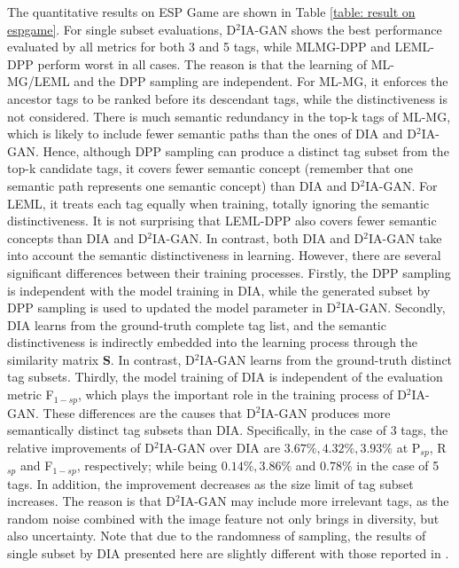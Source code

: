 \documentclass[10pt,twocolumn,letterpaper]{article}
\begin{document}
The quantitative results on ESP Game are shown in Table \ref{table: result on espgame}. For  single subset evaluations, D$^2$IA-GAN shows the best performance evaluated by all metrics for both 3 and 5 tags, while MLMG-DPP and LEML-DPP perform worst in all cases. The reason is that the learning of ML-MG/LEML and the DPP sampling are independent. For ML-MG, it enforces the ancestor tags to be ranked before its descendant tags, while the distinctiveness is not considered. There is much semantic redundancy in the top-k tags of ML-MG, which is likely to include fewer semantic paths than the ones of DIA and D$^2$IA-GAN. Hence, although DPP sampling can produce a distinct tag subset from the top-k candidate tags, it covers fewer semantic concept (remember that one semantic path represents one semantic concept) than DIA and D$^2$IA-GAN. 
For LEML, it treats each tag equally when training, totally ignoring the semantic distinctiveness. It is not surprising that LEML-DPP also covers fewer semantic concepts than DIA and D$^2$IA-GAN. 
%
In contrast, both DIA and D$^2$IA-GAN take into account the semantic distinctiveness in learning. 
However, there are several significant differences between their training processes. 
Firstly, the DPP sampling is independent with the model training in DIA, while the generated subset by DPP sampling is used to updated the model parameter in D$^2$IA-GAN. 
Secondly, DIA learns from the ground-truth complete tag list, and the semantic distinctiveness is indirectly embedded into the learning process through the similarity matrix $\mathbf{S}$. In contrast, D$^2$IA-GAN learns from the ground-truth distinct tag subsets. 
Thirdly, the model training of DIA is independent of the evaluation metric F$_{1-sp}$, which plays the important role in the training process of D$^2$IA-GAN. 
These differences are the causes that D$^2$IA-GAN produces more semantically distinct tag subsets than DIA. 
Specifically, in the case of 3 tags, the relative improvements of D$^2$IA-GAN over DIA are $3.67\%, 4.32\%, 3.93\%$ at P$_{sp}$, R$_{sp}$ and F$_{1-sp}$,  respectively; while being $0.14\%, 3.86\%$ and 
 $0.78\%$ in the case of 5 tags. 
In addition, the improvement decreases as the size limit of tag subset increases. The reason is that D$^2$IA-GAN may include more irrelevant tags, as the random noise combined with the image feature not only brings in diversity, but also uncertainty. 
Note that due to the randomness of sampling, the results of single subset by DIA presented here are slightly different with those reported in \cite{my-cvpr-2017-dia}.
\end{document}
